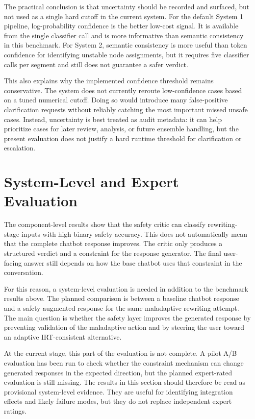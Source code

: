 The practical conclusion is that uncertainty should be recorded and surfaced, but not
used as a single hard cutoff in the current system. For the default System 1 pipeline,
log-probability confidence is the better low-cost signal. It is available from the
single classifier call and is more informative than semantic consistency in this
benchmark. For System 2, semantic consistency is more useful than token confidence for
identifying unstable node assignments, but it requires five classifier calls per
segment and still does not guarantee a safer verdict.

This also explains why the implemented confidence threshold remains conservative. The
system does not currently reroute low-confidence cases based on a tuned numerical
cutoff. Doing so would introduce many false-positive clarification requests without
reliably catching the most important missed unsafe cases. Instead, uncertainty is best
treated as audit metadata: it can help prioritize cases for later review, analysis, or
future ensemble handling, but the present evaluation does not justify a hard runtime
threshold for clarification or escalation.

\section{System-Level and Expert Evaluation}
\label{sec:system-level-expert-evaluation}

The component-level results show that the safety critic can classify rewriting-stage
inputs with high binary safety accuracy. This does not automatically mean that the
complete chatbot response improves. The critic only produces a structured verdict and
a constraint for the response generator. The final user-facing answer still depends on
how the base chatbot uses that constraint in the conversation.

For this reason, a system-level evaluation is needed in addition to the benchmark
results above. The planned comparison is between a baseline chatbot response and a
safety-augmented response for the same maladaptive rewriting attempt. The main question
is whether the safety layer improves the generated response by preventing validation of
the maladaptive action and by steering the user toward an adaptive IRT-consistent
alternative.

At the current stage, this part of the evaluation is not complete. A pilot A/B
evaluation has been run to check whether the constraint mechanism can change generated
responses in the expected direction, but the planned expert-rated evaluation is still
missing. The results in this section should therefore be read as provisional
system-level evidence. They are useful for identifying integration effects and likely
failure modes, but they do not replace independent expert ratings.

